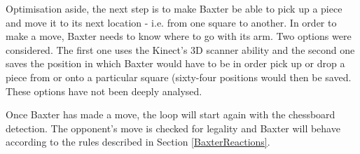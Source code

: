 \documentclass{l4proj}
\begin{document}
Optimisation aside, the next step is to make Baxter be able to pick up a piece and move it to its next location - i.e. from one square to another. In order to make a move, Baxter needs to know where to go with its arm. Two options were considered. The first one uses the Kinect's 3D scanner ability and the second one saves the position in which Baxter would have to be in order pick up or drop a piece from or onto a particular square (sixty-four positions would then be saved. These options have not been deeply analysed.

Once Baxter has made a move, the loop will start again with the chessboard detection. The opponent's move is checked for legality and Baxter will behave according to the rules described in Section \ref{BaxterReactions}.
\end{document}
